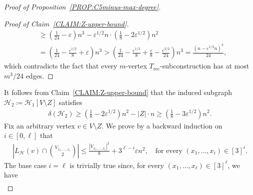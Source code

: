 \documentclass[11pt,a4paper]{article}
\newcommand{\op}[1]{\textcolor{blue}{OP: #1}}
\theoremstyle{remark}
\begin{document}
\begin{proof}[Proof of Proposition~\ref{PROP:C5minus-max-degree}]
\begin{proof}[Proof of Claim~\ref{CLAIM:Z-upper-bound}]
\begin{align*}
            & \ge \left(\frac{1}{24}- \varepsilon\right)n^3 - \varepsilon^{1/2} n \cdot \left(\frac{1}{8} - 2\varepsilon^{1/2}\right) n^2  \\
            & = \left(\frac{1}{24}- \frac{\varepsilon^{1/2}}{8} +\varepsilon\right)n^3 
            > \left(\frac{1}{24}- \frac{\varepsilon^{1/2}}{8} +\frac{\varepsilon}{8} - \frac{\varepsilon^{3/2}}{24}\right)n^3  
            = \frac{(n - \varepsilon^{1/2} n)^3}{24}, 
        \end{align*}
        which contradicts the fact that every $m$-vertex $T_{\mathrm{rec}}$-subconstruction has at most $m^3/24$ edges. 
    \end{proof}
    It follows from Claim~\ref{CLAIM:Z-upper-bound} that the induced subgraph $\mathcal{H}_2 \coloneqq \mathcal{H}_1[V\setminus Z]$ satisfies 
    \begin{align}\label{equ:min-deg-G1}
        \delta(\mathcal{H}_2)
        \ge \left(\frac{1}{8} - 2\varepsilon^{1/2}\right) n^2 - |Z| \cdot n 
        \ge \left(\frac{1}{8} - 3\varepsilon^{1/2}\right) n^2. 
    \end{align}
    Fix an arbitrary vertex $v \in V \setminus Z$. 
    We prove by a backward induction on $i \in [0, \ell]$ that  
    \begin{align}\label{equ:max-deg-inductive}
        \left|L_{\mathcal{H}}(v) \cap \binom{V_{x_1, \ldots, x_{i}}}{2}\right|
        \le \frac{|V_{x_1, \ldots, x_{i}}|^2}{8} + 3^{\ell-i} \varepsilon n^2,
        \quad\text{for every } 
        (x_1, \ldots, x_{i}) \in [3]^{i}. 
    \end{align}
    The base case $i = \ell$ is trivially true since, for every $(x_1, \ldots, x_{\ell}) \in [3]^{\ell}$,  we have
    \begin{align*}

\end{align*}
\end{proof}
\end{document}
